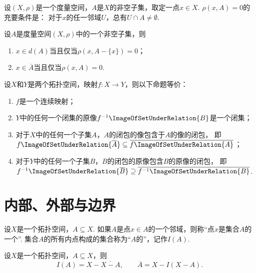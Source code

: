 \begin{corollary}
设\((X,\rho)\)是一个度量空间，\(A\)是\(X\)的非空子集，取定一点\(x \in X\).
\(\rho(x,A) = 0\)的充要条件是：
对于\(x\)的任一邻域\(U\)，总有\(U \cap A \neq \emptyset\).
\end{corollary}

\begin{theorem}
设\(A\)是度量空间\((X,\rho)\)中的一个非空子集，则
\begin{enumerate}
	\item \(x \in d(A)\)当且仅当\(\rho(x,A-\{x\})=0\)；
	\item \(x \in \overline{A}\)当且仅当\(\rho(x,A)=0\).
\end{enumerate}
\end{theorem}

\begin{theorem}
设\(X\)和\(Y\)是两个拓扑空间，映射\(f\colon X \to Y\)，则以下命题等价：
\begin{enumerate}
	\item \(f\)是一个连续映射；
	\item \(Y\)中的任何一个闭集的原像\(f^{-1}\ImageOfSetUnderRelation{B}\)是一个闭集；
	\item 对于\(X\)中的任何一个子集\(A\)，\(A\)的闭包的像包含于\(A\)的像的闭包，
	即\(f\ImageOfSetUnderRelation{\overline{A}}
	\subseteq
	\overline{f\ImageOfSetUnderRelation{A}}\)；
	\item 对于\(Y\)中的任何一个子集\(B\)，\(B\)的闭包的原像包含\(B\)的原像的闭包，
	即\(f^{-1}\ImageOfSetUnderRelation{\overline{B}}
	\supseteq
	\overline{f^{-1}\ImageOfSetUnderRelation{B}}\).
\end{enumerate}
\end{theorem}

\section{内部、外部与边界}
\begin{definition}\label{definition:拓扑学.内部的概念}
设\(X\)是一个拓扑空间，\(A \subseteq X\).
如果\(A\)是点\(x \in A\)的一个邻域，则称“点\(x\)是集合\(A\)的一个”.
集合\(A\)的所有内点构成的集合称为“\(A\)的”，记作\(I(A)\).
\end{definition}

\begin{theorem}\label{theorem:拓扑学.内部与闭包的联系}
设\(X\)是一个拓扑空间，\(A \subseteq X\)，则\[
I(A) = X - \overline{X - A}, \qquad
\overline{A} = X - I(X - A).
\]
\end{theorem}

